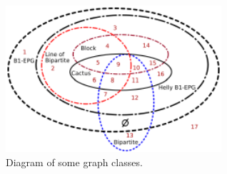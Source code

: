  \begin{figure}[htb]	
 \center%
 \includegraphics[width=8cm]{./img/diagram.pdf}
 \caption{Diagram of some graph classes.}
\label{fig:diagram}
\end{figure}  
 